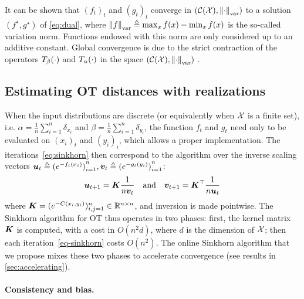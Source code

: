 It can be shown that ${(f_t)}_t$ and ${(g_t)}_t$ converge in $(\mathcal{C}(\mathcal{X}),
\left\| \cdot \right\|_{\text{var}})$ to a solution $(f^\star, g^\star)$ of
\eqref{eq:dual}, where $\left\| f \right\|_{\text{var}} \triangleq \max_x f(x) - \min_x f(x)$
is the so-called variation norm. Functions endowed with this norm are only
considered up to an additive constant.  Global convergence is due to the strict
contraction of the operators $T_{\beta}(\cdot)$ and
$T_{\alpha}(\cdot)$ in the space $(\mathcal{C}(\mathcal{X}), \left\| \cdot \right\|_{\text{var}})$
\citep{lemmens_nonlinear_2012}.

\subsection{Estimating OT distances with realizations}

When the input distributions are discrete (or equivalently when $\mathcal{X}$ is a
finite set), i.e. $\alpha = \frac{1}{n}\sum_{i=1}^n \delta_{x_i}$ and $\beta =
\frac{1}{n} \sum_{i=1}^n \delta_{y_i}$, the function $f_t$ and $g_t$ need only
to be evaluated on $(x_i)_t$ and $(y_i)_i$, which allows a proper
implementation. The iterations~\eqref{eq:sinkhorn} then correspond to the
\citet{sinkhorn1967concerning} algorithm over the inverse scaling vectors $\bm{u}_t
\triangleq {(e^{-f_t(x_i)})}_{i=1}^n, \bm{v}_t \triangleq
{(e^{-g_t(y_i)})}_{i=1}^n$:
\begin{equation}\label{eq-sinkhorn}
	\bm{u}_{t+1} = \bm{K} \frac{1}{n \bm{v}_t}
	\quad \text{and} \quad
	\bm{v}_{t+1} = \bm{K}^\top \frac{1}{n \bm{u}_t}
\end{equation}
where $\bm{K}=(e^{-C(x_i,y_i)})_{i,j=1}^n \in \mathbb{R}^{n \times n}$, and inversion is made pointwise. The Sinkhorn algorithm for OT thus
operates in two phases: first, the kernel matrix $\bm{K}$ is computed, with a cost in
$O(n^2 d)$, where $d$ is the dimension of $\mathcal{X}$; then each
iteration~\eqref{eq-sinkhorn} costs $O(n^2)$. The online Sinkhorn algorithm that we propose mixes
these two phases to accelerate convergence (see results in \autoref{sec:accelerating}).


\paragraph{Consistency and bias.}\label{sec:gradient}

